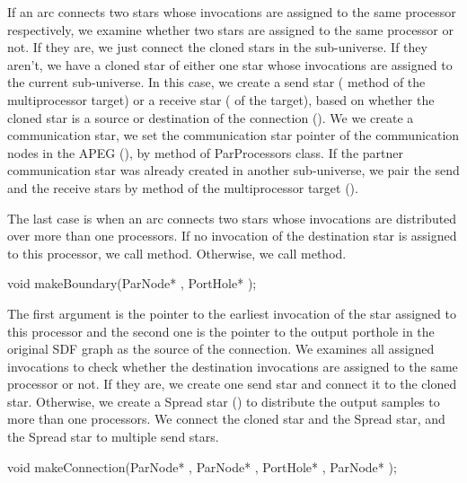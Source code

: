If an arc connects two stars whose invocations are assigned to the same
processor respectively, we examine whether two stars are assigned to
the same processor or not. If they are, we just connect the cloned
stars in the sub-universe. If they aren't, we have a cloned star of
either one star whose invocations are assigned to the current sub-universe.
In this case, we create a send star ( method of
the multiprocessor target) or a receive star ( of the
target), based on whether the cloned star is a source or destination of
the connection (). We we create a
communication star, we set the communication star pointer of
the communication nodes in the APEG (), 
by  method of ParProcessors class.
If the partner communication star was already created in another
sub-universe, we pair the send and the receive stars by
 method of the multiprocessor target
().

The last case is when an arc connects two stars whose invocations are
distributed over more than one processors. If no invocation of
the destination star is assigned to this processor, we call
 method. Otherwise, we call  method.

\begin{example}
void makeBoundary(ParNode* , PortHole* );
\end{example}

The first argument is the pointer to the earliest invocation of 
the star assigned to this processor and the second one is the pointer to
the output porthole in the original SDF graph as the source of the
connection. We examines all assigned invocations to check whether
the destination invocations are assigned to the same processor or not.
If they are, we create one send star and connect it to the cloned star.
Otherwise, we create a Spread star ()
to distribute the output samples
to more than one processors. We connect the cloned star and the Spread star, 
and the Spread star to multiple send stars.

\begin{example}
void makeConnection(ParNode* , ParNode* , PortHole* , ParNode* );
\end{example}

